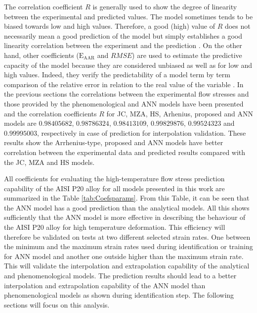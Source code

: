 \documentclass[twoside,english,1p,final,sort&compress]{elsarticle}
\theoremstyle{plain}
\newcommand{\AARE}{\text{E}_\text{AAR}}
\begin{document}
The correlation coefficient $R$ is generally used to show the degree of linearity between the experimental and predicted values. The model sometimes tends to be biased towards low and high values. Therefore, a good (high) value of $R$ does not necessarily mean a good prediction of the model but simply establishes a good linearity correlation between the experiment and the prediction \cite{phaniraj2003applicability}. On the other hand, other coefficients ($\AARE$ and $RMSE$) are used to estimate the predictive capacity of the model because they are considered unbiased as well as for low and high values. Indeed, they verify the predictability of a model term by term comparison of the relative error in relation to the real value of the variable \cite{srinivasulu2006comparative}. In the previous sections the correlations between the experimental flow stresses and those provided by the phenomenological and ANN models have been presented and the correlation coefficients $R$ for JC, MZA, HS, Arhenius, proposed and ANN models are $0.98405682$, $0.98786324$, $0.98413109$, $0.99829876$, $0.99524323$ and $0.99995003$, respectively in case of prediction for interpolation validation. These results show the Arrhenius-type, proposed and ANN models have better correlation between the experimental data and predicted results compared with the JC, MZA and HS models.

All coefficients for evaluating the high-temperature flow stress prediction capability of the AISI P20 alloy for all models presented in this work are summarized in the Table \ref{tab:Coefsparams}. From this Table, it can be seen that the ANN model has a good prediction than the analytical models. All this shows sufficiently that the ANN model is more effective in describing the behaviour of the AISI P20 alloy for high temperature deformation. This efficiency will therefore be validated on tests at two different selected strain rates. One between the minimum and the maximum strain rates used during identification or training for ANN model and another one outside higher than the maximum strain rate. This will validate the interpolation and extrapolation capability of the analytical and phenomenological models. The prediction results should lead to a better interpolation and extrapolation capability of the ANN model than phenomenological models as shown during identification step. The following sections will focus on this analysis.
\end{document}
